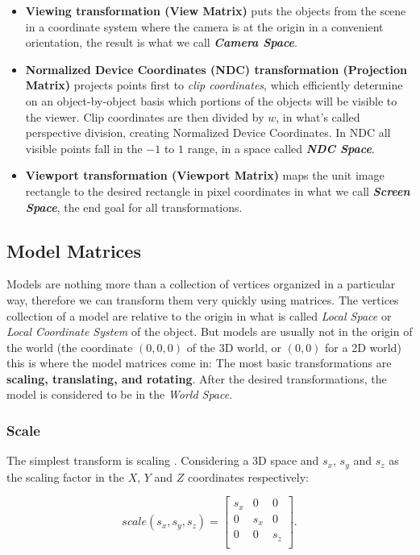 \documentclass[cic,tc,english]{iiufrgs}
\begin{document}
\begin{itemize}
    \item \textbf{Viewing transformation (View Matrix)} puts the objects from the scene in a coordinate system where the camera is at the origin in a convenient orientation, the result is what we call \textit{\textbf{Camera Space}}.
    \item \textbf{Normalized Device Coordinates (NDC) transformation (Projection Matrix)} projects points first to \textit{clip coordinates}, which efficiently determine on an object-by-object basis which portions of the objects will be visible to the viewer. Clip coordinates are then divided by $w$, in what's called perspective division, creating Normalized Device Coordinates. In NDC all visible points fall in the $-1$ to $1$ range, in a space called \textit{\textbf{NDC Space}}.
    \item \textbf{Viewport transformation (Viewport Matrix)} maps the unit image rectangle to the desired rectangle in pixel coordinates in what we call \textit{\textbf{Screen Space}}, the end goal for all transformations.
\end{itemize}

\subsection{Model Matrices}
Models are nothing more than a collection of vertices organized in a particular way, therefore we can transform them very quickly using matrices. The vertices collection of a model are relative to the origin in what is called \textit{Local Space} or \textit{Local Coordinate System} of the object. But models are usually not in the origin of the world (the coordinate $(0,0,0)$ of the 3D world, or $(0,0)$ for a 2D world) this is where the model matrices come in: The most basic transformations are \textbf{scaling, translating, and rotating}. After the desired transformations, the model is considered to be in the \textit{World Space}.

\subsubsection{Scale}
The simplest transform is scaling \cite{Marschner2021CGFundamentals}. Considering a 3D space and $s_x$, $s_y$ and $s_z$ as the scaling factor in the $X$, $Y$ and $Z$ coordinates respectively:

\begin{equation}
    scale(s_x, s_y, s_z) =
        \begin{bmatrix}
            s_x & 0 & 0 \\
            0 & s_x & 0 \\
            0 & 0 & s_z \\
        \end{bmatrix}
        .
    \label{matrices:scale}
\end{equation}
\end{document}
